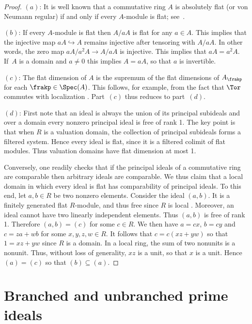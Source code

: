 \documentclass{amsart}
\numberwithin{equation}{section}%
\theoremstyle{remark}
\begin{document}
\begin{proof}
	$(a)$: It is well known that a commutative ring $A$ is absolutely flat (or von Neumann regular) if and only if every $A$-module is flat; see~\cite[Theorem~4.9]{Rotman09}.

	$(b)$: If every $A$-module is flat then $A/aA$ is flat for any $a \in A$. This implies that the injective map $aA \hookrightarrow A$ remains injective after tensoring with $A/aA$. In other words, the zero map $aA/a^2 A \to A/aA$ is injective. This implies that $aA=a^2 A$. If~$A$ is a domain and $a \neq 0$ this implies $A=aA$, so that $a$ is invertible.

	$(c)$: The flat dimension of $A$ is the supremum of the flat dimensions of $A_\frakp$ for each $\frakp \in \Spec(A)$. This follows, for example, from the fact that $\Tor$ commutes with localization \cite[Proposition~7.17]{Rotman09}. Part~$(c)$ thus reduces to part~$(d)$.

	$(d)$: First note that an ideal is always the union of its principal subideals and over a domain every nonzero principal ideal is free of rank 1. The key point is that when $R$ is a valuation domain, the collection of principal subideals forms a filtered system. Hence every ideal is flat, since it is a filtered colimit of flat modules. Thus valuation domains have flat dimension at most 1.

	Conversely, one readily checks that if the principal ideals of a commutative ring are comparable then arbitrary ideals are comparable. We thus claim that a local domain in which every ideal is flat has comparability of principal ideals. To this end, let $a,b\in R$ be two nonzero elements. Consider the ideal $(a,b)$. It is a finitely generated flat $R$-module, and thus free since $R$ is local \cite[Theorem 7.10]{Matsumura89}. Moreover, an ideal cannot have two linearly independent elements. Thus $(a,b)$ is free of rank 1. Therefore $(a,b)=(c)$ for some $c \in R$. We then have $a=cx$, $b=cy$ and $c=za+wb$ for some $x,y,z,w\in R$. It follows that $c=c(xz+yw)$ so that $1=xz+yw$ since $R$ is a domain. In a local ring, the sum of two nonunits is a nonunit. Thus, without loss of generality, $xz$ is a unit, so that $x$ is a unit. Hence $(a)=(c)$ so that $(b) \subseteq (a)$.
\end{proof}

\section{Branched and unbranched prime ideals}\label{sec:branched}
\end{document}
